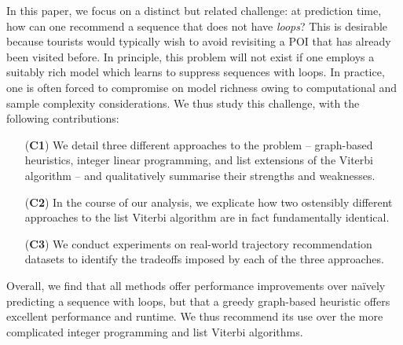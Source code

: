 In this paper, we focus on a distinct but related challenge:
at prediction time, how can one recommend a sequence that does not have \emph{loops}?
This is desirable because tourists would typically wish to avoid revisiting a POI that has already been visited before.
In principle, this problem will not exist if one employs a suitably rich model which learns to suppress sequences with loops.
In practice, one is often forced to compromise on model richness owing to computational and sample complexity considerations.
We thus study this challenge, with the following contributions:
\begin{enumerate}
	\item[(\textbf{C1})] We detail three different approaches to the problem -- 
	graph-based heuristics,
	integer linear programming,
	and
	list extensions of the Viterbi algorithm
	-- and qualitatively summarise their strengths and weaknesses.
	\item[(\textbf{C2})] In the course of our analysis, we explicate how two ostensibly different approaches to the list Viterbi algorithm \citep{seshadri1994list,nilsson2001sequentially} are in fact fundamentally identical.
	\item[(\textbf{C3})] We conduct experiments on real-world trajectory recommendation datasets to identify the tradeoffs imposed by each of the three approaches.
\end{enumerate}
Overall, we find that
all methods offer performance improvements over na\"{i}vely predicting a sequence with loops,
but that
a greedy graph-based heuristic offers excellent performance and runtime.
We thus recommend its use over the more complicated integer programming and list Viterbi algorithms.

